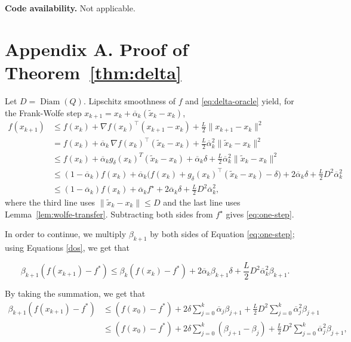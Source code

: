 \documentclass[smallextended]{svjour3}
\newcommand{\diam}{\operatorname{Diam}}
\begin{document}
\textbf{Code availability.} Not applicable.




\appendix
\section*{Appendix A. Proof of Theorem~\ref{thm:delta}}
Let $D=\diam(Q)$. Lipschitz smoothness of $f$ and \eqref{eq:delta-oracle} yield, for the Frank-Wolfe step $ x_{k+1}= x_k+\overline\alpha_k(\tilde x_k- x_k)$,
\begin{align*}
f( x_{k+1})
&\le f( x_k) + \nabla f( x_k)^\top( x_{k+1}- x_k) + \frac{L}{2}\| x_{k+1}- x_k\|^2 \\
&= f( x_k) + \overline\alpha_k\, \nabla f( x_k)^\top(\tilde x_k- x_k)
+\frac{L}{2}\overline\alpha_k^2 \|\tilde x_k- x_k\|^2 \\
&\le f( x_k) + \overline{\alpha}_k g_{\delta}( x_k)^T (\widetilde{ x}_k -  x_k) + \overline{\alpha}_k \delta + \frac{L}{2} \overline{\alpha}_k^2 \|\tilde{ x}_k -  x_k\|^2\\
&\le (1-\overline\alpha_k)f( x_k)
   + \overline\alpha_k\big(f( x_k)+g_\delta( x_k)^\top(\tilde x_k- x_k)-\delta\big)
   + 2\overline\alpha_k\delta + \tfrac{L}{2}D^2\overline\alpha_k^2 \\
&\le (1-\overline\alpha_k)f( x_k) + \overline\alpha_k f^\star + 2\overline\alpha_k\delta + \tfrac{L}{2}D^2\overline\alpha_k^2 ,
\end{align*}
where the third line uses $\|\tilde x_k- x_k\|\le D$ and the last line uses Lemma~\ref{lem:wolfe-transfer}.
Subtracting both sides from $f^\star$ gives \eqref{eq:one-step}. 

In order to continue, we multiply $\beta_{k+1}$ by both sides of Equation \eqref{eq:one-step}; using Equations \eqref{dos}, we get that 

\[\beta_{k+1} (f( x_{k + 1}) - f^*) \leq \beta_k (f( x_k) - f^*) + 2 \overline \alpha_k \beta_{k + 1} \delta + \frac{L}{2} D^2 \overline \alpha_k^2 \beta_{k + 1}. \]

By taking the summation, we get that 
\[
\begin{aligned}
\beta_{k + 1} (f( x_{k + 1}) - f^*) &\leq (f( x_0) - f^*) + 2\delta \sum_{j = 0}^k \overline \alpha_j \beta_{j + 1} + \frac{L}{2} D^2 \sum_{j = 0}^k\overline\alpha_j^2 \beta_{j + 1}\\
&\leq (f( x_0) - f^*) + 2\delta \sum_{j = 0}^k (\beta_{j + 1} - \beta_j) + \frac{L}{2} D^2 \sum_{j = 0}^k\overline\alpha_j^2 \beta_{j + 1},
\end{aligned}\]
\end{document}
